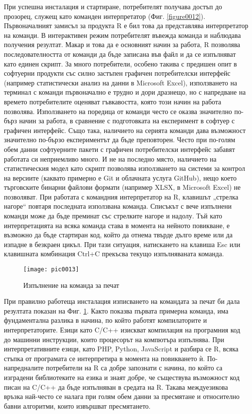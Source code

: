 При успешна инсталация и стартиране, потребителят получава достъп до прозорец, служещ като команден интерпретатор (Фиг. \ref{figure0012}). Първоначалният замисъл за продукта R е бил това да представлява интерпретатор на команди. В интерактивен режим потребителят въвежда команда и наблюдава получения резултат. Макар и това да е основният начин за работа, R позволява последователността от команди да бъде записана във файл и да се изпълняват като единен скрипт. За много потребители, особено такива с предишен опит в софтуерни продукти със силно застъпен графичен потребителски интерфейс (например статистически анализ на данни в Microsoft Excel), използването на терминал с команди първоначално е трудно и дори дразнещо, но с напредване на времето потребителите оценяват гъвкавостта, която този начин на работа позволява. Използването на поредица от команди често се оказва значително по-бърз начин за работа, в сравнение с подготовката на експеримент в софтуер с графичен интерфейс. Също така, наличието на серията команди дава възможност значително по-бързо експериментът да бъде преповторен. Често при по-голям обем данни софтуерните пакети с графичен потребителски интерфейс забавят работата си неприемливо много. И не на последно място, наличието на статистическия модел като скрипт позволява използването на системи за контрол на версиите (каквато примерно е Git и облачната услуга GitHub\cite{github}), нещо което търговските бинарни файлови формати (например XLSX, в Microsoft Excel) не позволяват. При работата с командния интерпретатор на R, клавишът „стрелка нагоре“ повтаря последната използвана команда. Списъкът с вече изпълнени команди може да бъде преминат със стрелките нагоре и надолу. Тъй като интерпретацията на всяка команда става в момента на нейното повикване, е възможно да бъде стартиран код, който да отнема твърде дълго време или да изпадне в безкраен цикъл. При тази ситуация, натискането на клавиша Esc или клавишната комбинация Ctrl+C прекъсва текущо изпълняваната команда. 

\begin{figure}[h]
  \centering
  \texttt{[image: pic0013]}
  \caption{Изпълнение на команда за печат}
\label{figure0013}
\end{figure}
\FloatBarrier

При правилно работеща инсталация изписването на командата за печат би дала резултата показан на Фиг. \ref{figure0013}. Както показва първата примерна команда, има фундаментална разлика в начина, по който работят компилаторите и интерпретаторите. Езици като C/C++ изискват компилация на програмния код до машинни инструкции, които процесорът на компютъра изпълнява. При интерпретативните езици, като PHP\cite{php}, Python\cite{python}, JavaScript\cite{javascript} и разбира се R, всяка стъпка от програмата се интерпретира в момента на повикването ѝ. По-напредналите потребители на R са добре запознати с начина, по който са изградени библиотеките на езика и знаят добре, че съществува възможност код писан на C/C++ да бъде изпълняван в средата на R. Такава междуезикова връзка най-често се налага при голям обем данни за пресмятане и относително бавни алгоритми, които извършват пресмятането.

